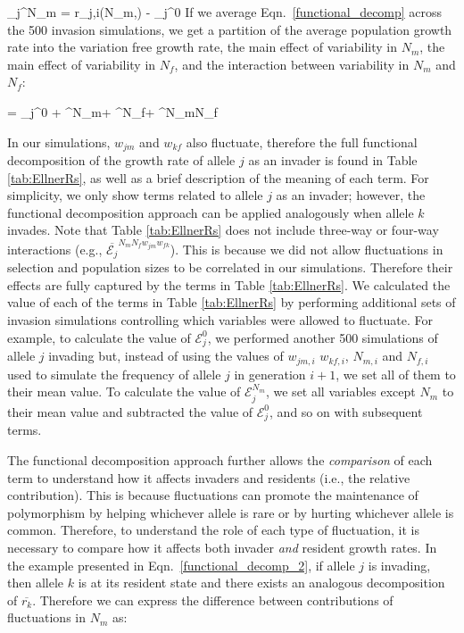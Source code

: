 \documentclass[12pt]{article}
\let\oldequation\equation
\let\oldendequation\endequation
\renewenvironment{equation}
  {\linenomathNonumbers\oldequation}
  {\oldendequation\endlinenomath}
\begin{document}
\begin{equation}
  _{j}^{N_{m}} = r_{j,i}(N_{m},) - _{j}^{0}
\end{equation}
If we average Eqn.~\ref{functional_decomp} across the 500 invasion simulations, we get a partition of the average population growth rate into the variation free growth rate, the main effect of variability in $N_{m}$, the main effect of variability in $N_{f}$, and the interaction between variability in $N_{m}$ and $N_{f}$:

\begin{equation}
    = _{j}^{0} + ^{N_{m}}+ ^{N_{f}}+ ^{N_{m}N_{f}}
   \label{functional_decomp_2}
\end{equation}

In our simulations, $w_{jm}$ and $w_{kf}$ also fluctuate, therefore the full functional decomposition of the growth rate of allele $j$ as an invader is found in Table \ref{tab:EllnerRs}, as well as a brief description of the meaning of each term. For simplicity, we only show terms related to allele $j$ as an invader; however, the functional decomposition approach can be applied analogously when allele $k$ invades. Note that Table \ref{tab:EllnerRs} does not include three-way or four-way interactions (e.g., $\overline{\mathcal{E}_{j}}^{N_{m}N_{f}w_{jm}w_{fk}}$). This is because we did not allow fluctuations in selection and population sizes to be correlated in our simulations. Therefore their effects are fully captured by the terms in Table \ref{tab:EllnerRs}. We calculated the value of each of the terms in Table \ref{tab:EllnerRs} by performing additional sets of invasion simulations controlling which variables were allowed to fluctuate. For example, to calculate the value of $\mathcal{E}_{j}^{0}$, we performed another 500 simulations of allele $j$ invading but, instead of using the values of $w_{jm,i}$ $w_{kf,i}$, $N_{m,i}$ and $N_{f,i}$ used to simulate the frequency of allele $j$ in generation $i+1$, we set all of them to their mean value. To calculate the value of $\mathcal{E}_{j}^{N_{m}}$, we set all variables except $N_{m}$ to their mean value and subtracted the value of $\mathcal{E}_{j}^{0}$, and so on with subsequent terms.

The functional decomposition approach further allows the \textit{comparison} of each term to understand how it affects invaders and residents (i.e., the relative contribution). This is because fluctuations can promote the maintenance of polymorphism by helping whichever allele is rare or by hurting whichever allele is common. Therefore, to understand the role of each type of fluctuation, it is necessary to compare how it affects both invader \textit{and} resident growth rates. In the example presented in Eqn.~\ref{functional_decomp_2}, if allele $j$ is invading, then allele $k$ is at its resident state and there exists an analogous decomposition of $\overline{r_{k}}$. Therefore we can express the difference between contributions of fluctuations in $N_{m}$ as:
\end{document}

